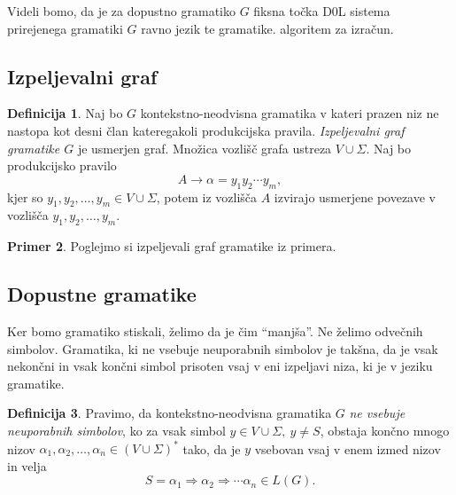 \documentclass{amsart}
\theoremstyle{definition}
\newtheorem{definicija}{Definicija}[section]
\newtheorem{primer}[definicija]{Primer}
\theoremstyle{plain} %
\begin{document}
Videli bomo, da je za dopustno gramatiko $G$ fiksna točka D0L sistema prirejenega gramatiki $G$ ravno jezik te gramatike. algoritem za izračun.

\subsection*{Izpeljevalni graf}

\begin{definicija}
    
    Naj bo $G$ kontekstno-neodvisna gramatika v kateri prazen niz ne nastopa kot desni član kateregakoli
    produkcijska pravila. \textit{Izpeljevalni graf gramatike $G$ } je usmerjen graf. Množica vozlišč grafa ustreza 
    $ V \cup \Sigma $. Naj bo produkcijsko pravilo
    \[    
        A \rightarrow \alpha = y_1 y_2 \cdots y_m,
    \]
    kjer so $ y_1, y_2, \ldots, y_m \in V \cup \Sigma $, potem iz vozlišča $ A $ izvirajo usmerjene povezave
    v vozlišča $ y_1, y_2, \ldots, y_m $.

\end{definicija}

\begin{primer}
    Poglejmo si izpeljevali graf gramatike iz primera.
%
\end{primer}

\subsection*{Dopustne gramatike}

Ker bomo gramatiko stiskali, želimo da je čim ``manjša''. Ne želimo odvečnih simbolov. Gramatika, ki ne vsebuje neuporabnih
simbolov je takšna, da je vsak nekončni in vsak končni simbol prisoten vsaj v eni izpeljavi niza, ki je v jeziku gramatike. 

\begin{definicija}
    
    Pravimo, da kontekstno-neodvisna gramatika $G$ \textit{ne vsebuje neuporabnih simbolov}, ko za vsak simbol
    $ y \in V \cup \Sigma, \ y \neq S $, obstaja končno mnogo nizov $ \alpha_1, \alpha_2, \ldots, \alpha_n \in 
    (V \cup \Sigma)^* $ tako, da je $y$ vsebovan vsaj v enem izmed nizov in velja
    \[
        S = \alpha_1 \Rightarrow \alpha_2 \Rightarrow \cdots \alpha_n \in L(G).
    \]

\end{definicija}
\end{document}
